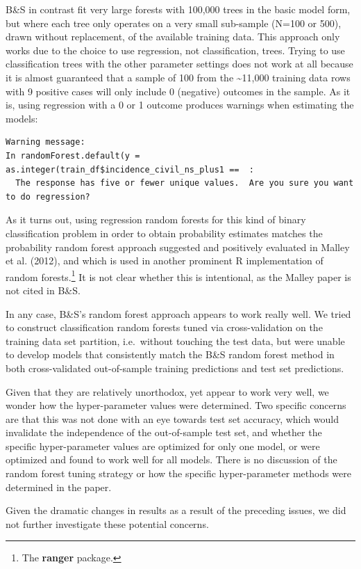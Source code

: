 \documentclass[
]{article}
\begin{document}
B\&S in contrast fit very large forests with 100,000 trees in the basic model form, but where each tree only operates on a very small sub-sample (N=100 or 500), drawn without replacement, of the available training data. This approach only works due to the choice to use regression, not classification, trees. Trying to use classification trees with the other parameter settings does not work at all because it is almost guaranteed that a sample of 100 from the \textasciitilde11,000 training data rows with 9 positive cases will only include 0 (negative) outcomes in the sample. As it is, using regression with a 0 or 1 outcome produces warnings when estimating the models:

\begin{verbatim}
Warning message:
In randomForest.default(y = as.integer(train_df$incidence_civil_ns_plus1 ==  :
  The response has five or fewer unique values.  Are you sure you want to do regression?
\end{verbatim}

As it turns out, using regression random forests for this kind of binary classification problem in order to obtain probability estimates matches the probability random forest approach suggested and positively evaluated in Malley et al. (2012), and which is used in another prominent R implementation of random forests.\footnote{The \textbf{ranger} package.} It is not clear whether this is intentional, as the Malley paper is not cited in B\&S.

In any case, B\&S's random forest approach appears to work really well. We tried to construct classification random forests tuned via cross-validation on the training data set partition, i.e.~without touching the test data, but were unable to develop models that consistently match the B\&S random forest method in both cross-validated out-of-sample training predictions and test set predictions.

Given that they are relatively unorthodox, yet appear to work very well, we wonder how the hyper-parameter values were determined. Two specific concerns are that this was not done with an eye towards test set accuracy, which would invalidate the independence of the out-of-sample test set, and whether the specific hyper-parameter values are optimized for only one model, or were optimized and found to work well for all models. There is no discussion of the random forest tuning strategy or how the specific hyper-parameter methods were determined in the paper.

Given the dramatic changes in results as a result of the preceding issues, we did not further investigate these potential concerns.
\end{document}
